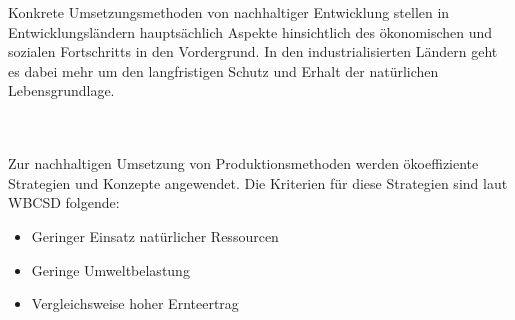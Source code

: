 \documentclass{scrartcl}
\begin{document}
 Konkrete Umsetzungsmethoden von nachhaltiger Entwicklung stellen in Entwicklungsländern hauptsächlich Aspekte hinsichtlich des ökonomischen und sozialen Fortschritts in den Vordergrund. In den industrialisierten Ländern geht es dabei mehr um den langfristigen Schutz und Erhalt der natürlichen Lebensgrundlage. 
 
 \\
 \\
 
 Zur nachhaltigen Umsetzung von Produktionsmethoden werden ökoeffiziente Strategien und Konzepte angewendet. Die Kriterien für diese Strategien sind laut WBCSD folgende:
\begin{itemize}
\item Geringer Einsatz natürlicher Ressourcen
\item Geringe Umweltbelastung
\item Vergleichsweise hoher Ernteertrag
\end{itemize}
\end{document}
